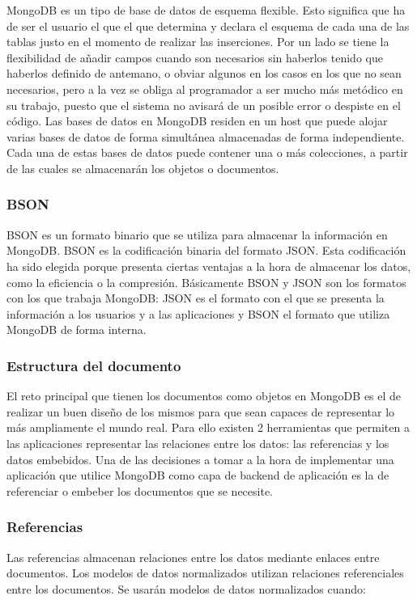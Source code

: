 \documentclass[preprint,12pt]{elsarticle}
\begin{document}
MongoDB es un tipo de base de datos de esquema flexible. Esto significa que ha de ser el usuario el que el que determina y declara el esquema de cada una de las tablas justo en el momento de realizar las inserciones.
Por un lado se tiene la flexibilidad de añadir campos cuando son necesarios sin haberlos tenido que haberlos definido de antemano, o obviar algunos en los casos en los que no sean necesarios, pero a la vez se obliga al programador a ser mucho más metódico en su trabajo, puesto que el sistema no avisará de un posible error o despiste en el código.
Las bases de datos en MongoDB residen en un host que puede alojar varias bases de datos de forma simultánea almacenadas de forma independiente. Cada una de estas bases de datos puede contener una o más colecciones, a partir de las cuales se almacenarán los objetos o documentos.

\subsubsection{\textbf{BSON}}

BSON es un formato binario que se utiliza para almacenar la información en MongoDB. BSON es la codificación binaria del formato JSON. Esta codificación ha sido elegida porque presenta ciertas ventajas a la hora de almacenar los datos, como la eficiencia o la compresión.
Básicamente BSON y JSON son los formatos con los que trabaja MongoDB: JSON es el formato con el que se presenta la información a los usuarios y a las aplicaciones y BSON el formato que utiliza MongoDB de forma interna.

\subsubsection{\textbf{Estructura del documento}}

El reto principal que tienen los documentos como objetos en MongoDB es el de realizar un buen diseño de los mismos para que sean capaces de representar lo más ampliamente el mundo real. Para ello existen 2 herramientas que permiten a las aplicaciones representar las relaciones entre los datos: las referencias y los datos embebidos. Una de las decisiones a tomar a la hora de implementar una aplicación que utilice MongoDB como capa de backend de aplicación es la de referenciar o embeber los documentos que se necesite.

\subsubsection{\textbf{Referencias}}
Las referencias almacenan relaciones entre los datos mediante enlaces entre documentos.
Los modelos de datos normalizados utilizan relaciones referenciales entre los documentos. Se usarán modelos de datos normalizados cuando:
\end{document}
